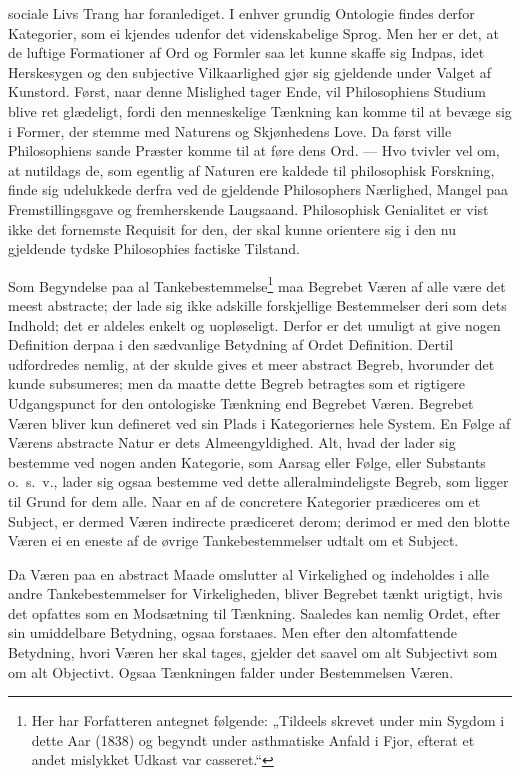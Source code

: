 \documentclass[12pt]{article}
\newcommand{\opage}[1]{\marginnote{\footnotesize\textit{[#1]}}}
\begin{document}
sociale Livs Trang har foranlediget. I enhver grundig Ontologie findes derfor
Kategorier, som ei kjendes udenfor det videnskabelige Sprog. Men her er det, at de
luftige Formationer af Ord og Formler saa let kunne skaffe sig Indpas, idet
Herskesygen og den subjective Vilkaarlighed gjør sig gjeldende under Valget af
Kunstord. Først, naar denne Mislighed tager Ende, vil Philosophiens Studium
blive ret glædeligt, fordi den menneskelige Tænkning kan komme til at bevæge sig
i Former, der stemme med Naturens og Skjønhedens Love. Da først ville
Philosophiens sande Præster komme til at føre dens Ord. --- Hvo tvivler vel om,
at nutildags de, som egentlig af Naturen ere kaldede til philosophisk Forskning,
finde sig udelukkede derfra ved de gjeldende Philosophers Nærlighed, Mangel paa
Fremstillingsgave og fremherskende Laugsaand. Philosophisk Genialitet er vist
ikke det fornemste Requisit for den, der skal kunne orientere sig i den nu
gjeldende tydske Philosophies factiske Tilstand.

Som Begyndelse paa al Tankebestemmelse\footnote{Her har Forfatteren antegnet
følgende: „Tildeels skrevet under min Sygdom i dette Aar (1838) og begyndt under
asthmatiske Anfald i Fjor, efterat et andet mislykket Udkast var casseret.“} maa
Begrebet Væren af alle være det meest abstracte; der lade sig ikke adskille
forskjellige Bestemmelser deri som dets Indhold; det er aldeles enkelt og
uopløseligt. Derfor er det umuligt at give nogen Definition derpaa i den
sædvanlige Betydning af Ordet Definition. Dertil udfordredes nemlig, at der skulde
gives et meer abstract \opage{210}Begreb, hvorunder det kunde subsumeres; men da
maatte dette Begreb betragtes som et rigtigere Udgangspunct for den ontologiske
Tænkning end Begrebet Væren. Begrebet Væren bliver kun defineret ved sin Plads i
Kategoriernes hele System. En Følge af Værens abstracte Natur er dets
Almeengyldighed. Alt, hvad der lader sig bestemme ved nogen anden Kategorie, som
Aarsag eller Følge, eller Substants o.\ s.\ v., lader sig ogsaa bestemme ved
dette alleralmindeligste Begreb, som ligger til Grund for dem alle. Naar en af de
concretere Kategorier prædiceres om et Subject, er dermed Væren indirecte
prædiceret derom; derimod er med den blotte Væren ei en eneste af de øvrige
Tankebestemmelser udtalt om et Subject.

Da Væren paa en abstract Maade omslutter al Virkelighed og indeholdes i alle
andre Tankebestemmelser for Virkeligheden, bliver Begrebet tænkt urigtigt, hvis
det opfattes som en Modsætning til Tænkning. Saaledes kan nemlig Ordet, efter sin
umiddelbare Betydning, ogsaa forstaaes. Men efter den altomfattende Betydning,
hvori Væren her skal tages, gjelder det saavel om alt Subjectivt som om alt
Objectivt. Ogsaa Tænkningen falder under Bestemmelsen Væren.
\end{document}
